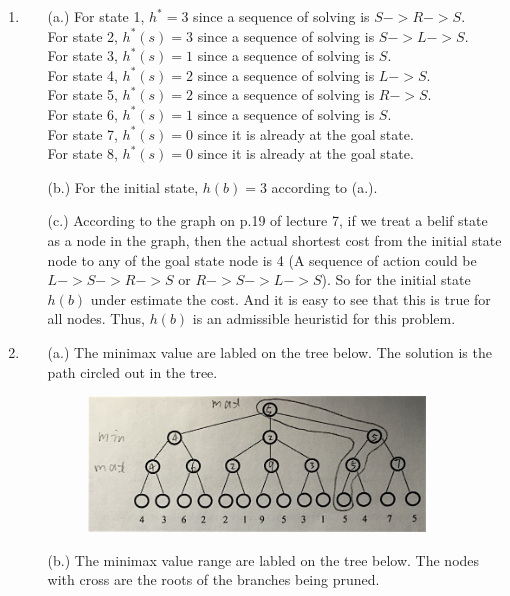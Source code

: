 \documentclass[12pt]{article}
\begin{document}
\begin{singlespace}
\begin{enumerate}
\item
	\begin{itemize}
	\item[(a.)] For state 1, $h^* = 3$ since a sequence of solving is $S->R->S$.\\
	For state 2, $h^*(s) = 3$ since a sequence of solving is $S->L->S$.\\
	For state 3, $h^*(s) = 1$ since a sequence of solving is $S$.\\
	For state 4, $h^*(s) = 2$ since a sequence of solving is $L->S$.\\
	For state 5, $h^*(s) = 2$ since a sequence of solving is $R->S$.\\
	For state 6, $h^*(s) = 1$ since a sequence of solving is $S$.\\
	For state 7, $h^*(s) = 0$ since it is already at the goal state.\\
	For state 8, $h^*(s) = 0$ since it is already at the goal state.\\
	\item[(b.)] For the initial state, $h(b) = 3$ according to (a.).
	\item[(c.)] According to the graph on p.19 of lecture 7, if we treat a belif state as a node in the graph, then the actual shortest cost from the initial state node to any of the goal state node is 4 (A sequence of action could be $L->S->R->S$ or $R->S->L->S$). So for the initial state $h(b)$ under estimate the cost. And it is easy to see that this is true for all nodes. Thus, $h(b)$ is an admissible heuristid for this problem.
	\end{itemize}
\item
	\begin{itemize}
	\item[(a.)] The minimax value are labled on the tree below. The solution is the path circled out in the tree.
	\begin{figure}[h]
	\centering
	\includegraphics[width=0.9\textwidth]{3a} 
	\end{figure}
	\item[(b.)] The minimax value range are labled on the tree below. The nodes with cross are the roots of the branches being pruned.

\end{itemize}
\end{enumerate}
\end{singlespace}
\end{document}

